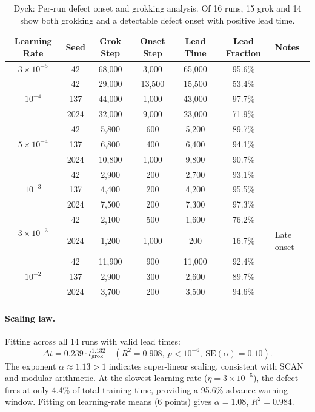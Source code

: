 \documentclass[11pt]{article}
\newcommand{\grokstep}{t_{\text{grok}}}
\newcommand{\leadtime}{\Delta t}
\begin{document}
\begin{table}[t]
  \centering
  \caption{Dyck: Per-run defect onset and grokking analysis. Of 16 runs, 15 grok and 14 show both grokking and a detectable defect onset with positive lead time.}
  \label{tab:dyck_runs}
  \small
  \begin{tabular}{@{}ccccccp{3cm}@{}}
    \toprule
    Learning Rate & Seed & Grok Step & Onset Step & Lead Time & Lead Fraction & Notes \\
    \midrule
    $3{\times}10^{-5}$ & 42 & 68,000 & 3,000 & 65,000 & 95.6\% & \\
    \midrule
    \multirow{3}{*}{$10^{-4}$} & 42 & 29,000 & 13,500 & 15,500 & 53.4\% & \\
    & 137 & 44,000 & 1,000 & 43,000 & 97.7\% & \\
    & 2024 & 32,000 & 9,000 & 23,000 & 71.9\% & \\
    \midrule
    \multirow{3}{*}{$5{\times}10^{-4}$} & 42 & 5,800 & 600 & 5,200 & 89.7\% & \\
    & 137 & 6,800 & 400 & 6,400 & 94.1\% & \\
    & 2024 & 10,800 & 1,000 & 9,800 & 90.7\% & \\
    \midrule
    \multirow{3}{*}{$10^{-3}$} & 42 & 2,900 & 200 & 2,700 & 93.1\% & \\
    & 137 & 4,400 & 200 & 4,200 & 95.5\% & \\
    & 2024 & 7,500 & 200 & 7,300 & 97.3\% & \\
    \midrule
    \multirow{2}{*}{$3{\times}10^{-3}$} & 42 & 2,100 & 500 & 1,600 & 76.2\% & \\
    & 2024 & 1,200 & 1,000 & 200 & 16.7\% & Late onset \\
    \midrule
    \multirow{3}{*}{$10^{-2}$} & 42 & 11,900 & 900 & 11,000 & 92.4\% & \\
    & 137 & 2,900 & 300 & 2,600 & 89.7\% & \\
    & 2024 & 3,700 & 200 & 3,500 & 94.6\% & \\
    \bottomrule
  \end{tabular}
\end{table}

\paragraph{Scaling law.} Fitting across all 14 runs with valid lead times:
\begin{equation}
  \leadtime = 0.239 \cdot \grokstep^{1.132} \quad (R^2 = 0.908,\ p < 10^{-6},\ \text{SE}(\alpha) = 0.10).
  \label{eq:dyck_scaling}
\end{equation}
The exponent $\alpha \approx 1.13 > 1$ indicates super-linear scaling, consistent with SCAN and modular arithmetic. At the slowest learning rate ($\eta = 3{\times}10^{-5}$), the defect fires at only 4.4\% of total training time, providing a 95.6\% advance warning window. Fitting on learning-rate means (6 points) gives $\alpha = 1.08$, $R^2 = 0.984$.
\end{document}
